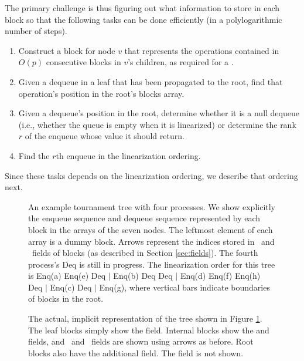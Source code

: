 The primary challenge is thus figuring out what information to store in each block so that 
the following tasks can be done efficiently (in a polylogarithmic number of steps).
\begin{enumerate}[label={(T\arabic*)}]
\item
\label{construct}
Construct a block for node $v$ that represents the operations contained in $O(p)$ consecutive blocks in $v$'s children, as required for a .
\item
\label{findinroot}
Given a dequeue in a leaf that has been propagated to the root, find that operation's position in the root's blocks array.
\item
\label{findrank}
Given a dequeue's position in the root, determine whether it is a null dequeue (i.e., whether the queue is empty when it is linearized)
or determine the rank $r$ of the enqueue whose value it should return.
\item
\label{findenqueue}
Find the $r$th enqueue in the linearization ordering.
\end{enumerate}
Since these tasks depends on the linearization ordering, we describe that ordering next.

\begin{figure}[tb]

\caption{An example tournament tree with four processes. 
We show explicitly the enqueue sequence and dequeue sequence represented by each block in the  arrays of the seven nodes.  The leftmost element of each  array is a dummy block.
Arrows represent the indices stored in \eleft\ and \eright\ fields of blocks (as described in Section \ref{sec:fields}).
The fourth process's Deq is still in progress.
The linearization order for this tree is
Enq(a) Enq(e) Deq $\mid$ Enq(b) Deq Deq $\mid$ Enq(d) Enq(f) Enq(h) Deq $\mid$ Enq(c) Deq $\mid$ Enq(g), where vertical bars indicate boundaries of blocks in the root.\label{tournament}}
\end{figure}

\begin{figure}

\caption{\label{implicit}The actual, implicit representation of the tree shown in Figure \ref{tournament}.
The leaf blocks simply show the  field.
Internal blocks show the  and  fields,
and \eleft\ and \eright\ fields are shown using arrows as before.
Root blocks also have the additional  field.
The  field is not shown.}
\end{figure}

